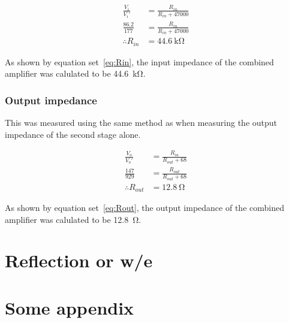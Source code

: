\documentclass[a4paper,11pt]{article}
\begin{document}
            \begin{subequations} \label{eq:Rin}
            \begin{align}
                \frac{V_{i}}{V_{i}'} &= \frac{R_{in}}{R_{in} + 47000}   \\
                \frac{86.2}{177} &= \frac{R_{in}}{R_{in} + 47000}   \\
                \therefore R_{in} &= \SI{44.6}{\kilo\ohm}
            \end{align}
            \end{subequations}
            
            As shown by equation set~\ref{eq:Rin}, the input impedance of the combined amplifier was calulated to be \SI{44.6}{\kilo\ohm}.
            
        \subsubsection{Output impedance}
            This was measured using the same method as when measuring the output impedance of the second stage alone.
            
            \begin{subequations} \label{eq:Rout}
            \begin{align}
                \frac{V_{o}}{V_{o}'} &= \frac{R_{in}}{R_{out} + 68}   \\
                \frac{147}{929} &= \frac{R_{out}}{R_{out} + 68}   \\
                \therefore R_{out} &= \SI{12.8}{\ohm}
            \end{align}
            \end{subequations}
            
            As shown by equation set~\ref{eq:Rout}, the output impedance of the combined amplifier was calulated to be \SI{12.8}{\ohm}.

\newpage
\section{Reflection or w/e}

\newpage
\begin{appendices}
    \label{appendix}
    \section{Some appendix}
    \label{app:one}
\end{appendices}



\end{document}
